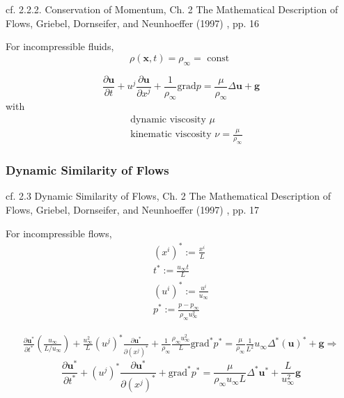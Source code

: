 \documentclass[10pt]{amsart}
\begin{document}
\begin{multicols*}{2}
\begin{enumerate}
  \end{enumerate}

cf. 2.2.2. Conservation of Momentum, Ch. 2 The Mathematical Description of Flows, Griebel, Dornseifer, and Neunhoeffer (1997) \cite{GDN1997}, pp. 16

For incompressible fluids,
\[
\rho(\mathbf{x},t) = \rho_{\infty} = \text{ const }
\]

\begin{equation}
  \frac{ \partial \mathbf{u}}{ \partial t} + u^j \frac{ \partial \mathbf{u} }{ \partial x^j} + \frac{1}{\rho_{\infty}} \text{grad}p = \frac{ \mu}{ \rho_{\infty} } \Delta \mathbf{u} + \mathbf{g}
  \end{equation}
with
\[
\begin{aligned}
  & \text{ dynamic viscosity $\mu$ } \\
  & \text{ kinematic viscosity } \nu = \frac{ \mu }{ \rho_{\infty}} \end{aligned}
\]

\subsubsection{Dynamic Similarity of Flows}

cf. 2.3 Dynamic Similarity of Flows, Ch. 2 The Mathematical Description of Flows, Griebel, Dornseifer, and Neunhoeffer (1997) \cite{GDN1997}, pp. 17

For incompressible flows,
\begin{equation}
  \begin{aligned}
    (x^i)^* := \frac{ x^i}{L}   \\
    t^* := \frac{u_{\infty} t}{L} \\
    (u^i)^* := \frac{u^i}{ u_{\infty} } \\
    p^* := \frac{ p - p_{\infty} }{ \rho_{\infty} u^2_{\infty} }
    \end{aligned}
  \end{equation}

\[
\begin{gathered}
  \frac{ \partial \mathbf{u}^*}{ \partial t^*} \left( \frac{u_{\infty} }{ L/u_{\infty} } \right) + \frac{u_{\infty}^2 }{L} (u^j)^* \frac{ \partial \mathbf{u}^* }{ \partial (x^j)^*} + \frac{1}{\rho_{\infty}} \frac{ \rho_{\infty} u_{\infty}^2 }{ L} \text{grad}^*p^* = \frac{ \mu}{ \rho_{\infty} } \frac{1}{L^2} u_{\infty} \Delta^* ( \mathbf{u})^* + \mathbf{g} \Longrightarrow
  \end{gathered}
\]
\begin{equation}\label{Eq:momconsvincompresssimilar}
\frac{ \partial \mathbf{u}^*}{ \partial t^*} + (u^j)^* \frac{ \partial \mathbf{u}^* }{ \partial (x^j)^* } + \text{grad}^* p^* = \frac{ \mu}{ \rho_{\infty} u_{\infty} L} \Delta^* \mathbf{u}^* + \frac{L}{u^2_{\infty} } \mathbf{g}
  \end{equation}


\end{multicols*}
\end{document}
